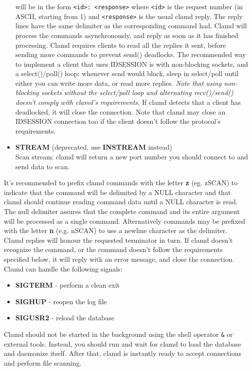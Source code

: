 \documentclass[a4paper,titlepage,12pt]{article}
\begin{document}
\begin{itemize}
	    will be in the form \verb+<id>: <response>+ where \verb+<id>+ is
	    the request number (in ASCII, starting from 1) and \verb+<response>+
	    is the usual clamd reply. The reply lines have the same delimiter
	    as the corresponding command had. Clamd will process the commands
	    asynchronously, and reply as soon as it has finished processing.
	    Clamd requires clients to read all the replies it sent, before
	    sending more commands to prevent send() deadlocks. The recommended
	    way to implement a client that uses IDSESSION is with non-blocking
	    sockets, and a select()/poll() loop: whenever send would block,
	    sleep in select/poll until either you can write more data, or read
	    more replies. \emph{Note that using non-blocking sockets without
	    the select/poll loop and alternating recv()/send() doesn't comply
	    with clamd's requirements.} If clamd detects that a client has
	    deadlocked, it will close the connection. Note that clamd may
	    close an IDSESSION connection too if the client doesn't follow the
	    protocol's requirements.
	\item \textbf{STREAM} (deprecated, use \textbf{INSTREAM} instead)\\
	    Scan stream: clamd will return a new port number you should
	    connect to and send data to scan.
    \end{itemize}
    It's recommended to prefix clamd commands with the letter \textbf{z}
    (eg. zSCAN) to indicate that the command will be delimited by a NULL
    character and that clamd should continue reading command data until a NULL
    character is read. The null delimiter assures that the complete command
    and its entire argument will be processed as a single command. Alternatively
    commands may be prefixed with the letter \textbf{n} (e.g. nSCAN) to use
    a newline character as the delimiter. Clamd replies will honour the
    requested terminator in turn. If clamd doesn't recognize the command, or
    the command doesn't follow the requirements specified below, it will reply
    with an error message, and close the connection.
    \noindent
    Clamd can handle the following signals:
    \begin{itemize}
	\item \textbf{SIGTERM} - perform a clean exit
	\item \textbf{SIGHUP} - reopen the log file
	\item \textbf{SIGUSR2} - reload the database
    \end{itemize}
    Clamd should not be started in the background using the shell operator
    \verb+&+ or external tools. Instead, you should run and wait for clamd
    to load the database and daemonize itself. After that, clamd is instantly
    ready to accept connections and perform file scanning.
\end{document}
